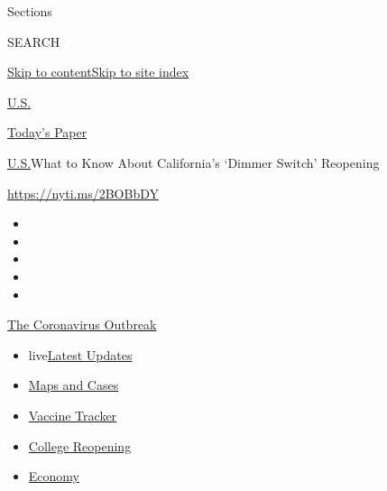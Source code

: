Sections

SEARCH

\protect\hyperlink{site-content}{Skip to
content}\protect\hyperlink{site-index}{Skip to site index}

\href{https://www.nytimes.com/section/us}{U.S.}

\href{https://myaccount.nytimes.com/auth/login?response_type=cookie\&client_id=vi}{}

\href{https://www.nytimes.com/section/todayspaper}{Today's Paper}

\href{/section/us}{U.S.}\textbar{}What to Know About California's
`Dimmer Switch' Reopening

\url{https://nyti.ms/2BOBbDY}

\begin{itemize}
\item
\item
\item
\item
\item
\end{itemize}

\href{https://www.nytimes.com/news-event/coronavirus?action=click\&pgtype=Article\&state=default\&region=TOP_BANNER\&context=storylines_menu}{The
Coronavirus Outbreak}

\begin{itemize}
\tightlist
\item
  live\href{https://www.nytimes.com/2020/08/04/world/coronavirus-cases.html?action=click\&pgtype=Article\&state=default\&region=TOP_BANNER\&context=storylines_menu}{Latest
  Updates}
\item
  \href{https://www.nytimes.com/interactive/2020/us/coronavirus-us-cases.html?action=click\&pgtype=Article\&state=default\&region=TOP_BANNER\&context=storylines_menu}{Maps
  and Cases}
\item
  \href{https://www.nytimes.com/interactive/2020/science/coronavirus-vaccine-tracker.html?action=click\&pgtype=Article\&state=default\&region=TOP_BANNER\&context=storylines_menu}{Vaccine
  Tracker}
\item
  \href{https://www.nytimes.com/2020/08/02/us/covid-college-reopening.html?action=click\&pgtype=Article\&state=default\&region=TOP_BANNER\&context=storylines_menu}{College
  Reopening}
\item
  \href{https://www.nytimes.com/live/2020/08/04/business/stock-market-today-coronavirus?action=click\&pgtype=Article\&state=default\&region=TOP_BANNER\&context=storylines_menu}{Economy}
\end{itemize}

